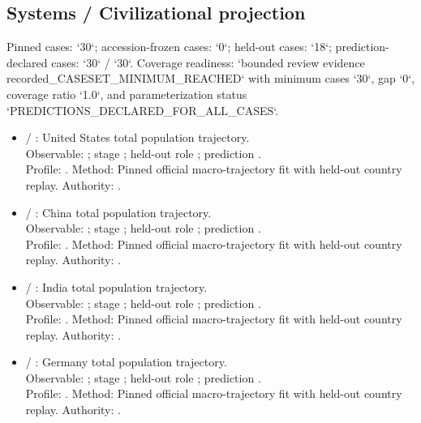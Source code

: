 \subsection{Systems / Civilizational projection}
Pinned cases: `30`; accession-frozen cases: `0`; held-out cases: `18`; prediction-declared cases: `30` / `30`.
Coverage readiness: `bounded review evidence recorded\_CASESET\_MINIMUM\_REACHED` with minimum cases `30`, gap `0`, coverage ratio `1.0`, and parameterization status `PREDICTIONS\_DECLARED\_FOR\_ALL\_CASES`.
\begin{itemize}
\item {} / : United States total population trajectory.\\ Observable: ; stage ; held-out role ; prediction .\\ Profile: . Method: Pinned official macro-trajectory fit with held-out country replay. Authority: .
\item {} / : China total population trajectory.\\ Observable: ; stage ; held-out role ; prediction .\\ Profile: . Method: Pinned official macro-trajectory fit with held-out country replay. Authority: .
\item {} / : India total population trajectory.\\ Observable: ; stage ; held-out role ; prediction .\\ Profile: . Method: Pinned official macro-trajectory fit with held-out country replay. Authority: .
\item {} / : Germany total population trajectory.\\ Observable: ; stage ; held-out role ; prediction .\\ Profile: . Method: Pinned official macro-trajectory fit with held-out country replay. Authority: .

\end{itemize}
